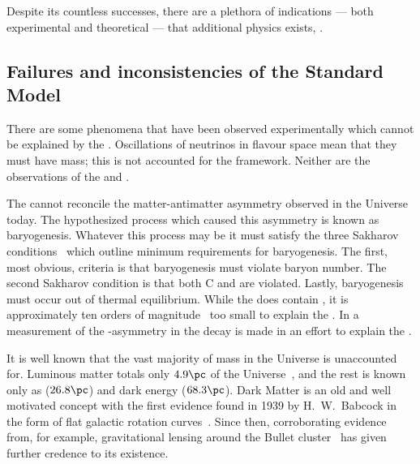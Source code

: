 Despite its countless successes, there are a plethora of indications --- both
experimental and theoretical --- that additional physics exists, \bsm.



\subsection{Failures and inconsistencies of the Standard Model}
\label{sec:bsm:fail}
There are some phenomena that have been observed experimentally which cannot be explained by the
\sm.
Oscillations of neutrinos in flavour space mean that they must have mass; this is not accounted for
the \sm framework.
Neither are the observations of the \BAU and \dm.

The \sm cannot reconcile the matter-antimatter asymmetry observed in the
Universe today.
The hypothesized process which caused this asymmetry is known as baryogenesis.
Whatever this process may be it must satisfy the three Sakharov
conditions~\cite{1991SvPhU..34..392S} which outline minimum requirements for baryogenesis.
The first, most obvious, criteria is that baryogenesis must violate baryon number.
The second Sakharov condition is that both \gls{C} and \CP are violated.
Lastly, baryogenesis must occur out of thermal equilibrium.
While the \sm does contain \CPV, it is approximately ten orders of
magnitude~\cite{Cline:2006ts,Huet:1994jb} too small to explain the \BAU.
In  a measurement of the \CP-asymmetry in the decay \btodsphi is made in an effort
to explain the \BAU.




It is well known that the vast majority of mass in the Universe is unaccounted for.
Luminous matter totals only \approx$4.9\pc$ of the Universe~\cite{Adam:2015rua,PDG2014}, and the rest
is known only as \dm (\approx$26.8\pc$) and dark energy (\approx$68.3\pc$).
Dark Matter is an old and well motivated concept with the first evidence found in 1939 by H.~W.~Babcock
in the form of flat galactic rotation curves~\cite{1970ApJ...159..379R,1980ApJ...238..471R}.
Since then, corroborating evidence from, for example, gravitational lensing around the Bullet
cluster~\cite{Markevitch:2003at} has given further credence to its existence.

